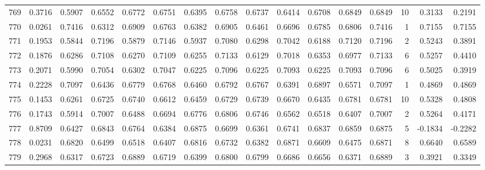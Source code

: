 \begin{tabular}{lrrrrrrrrrrrrrrr}
769 &      0.3716 &  0.5907 &  0.6552 &  0.6772 &  0.6751 &  0.6395 &  0.6758 &  0.6737 &  0.6414 &  0.6708 &   0.6849 &     0.6849 &     10 &                    0.3133 &                     0.2191 \\
770 &      0.0261 &  0.7416 &  0.6312 &  0.6909 &  0.6763 &  0.6382 &  0.6905 &  0.6461 &  0.6696 &  0.6785 &   0.6806 &     0.7416 &      1 &                    0.7155 &                     0.7155 \\
771 &      0.1953 &  0.5844 &  0.7196 &  0.5879 &  0.7146 &  0.5937 &  0.7080 &  0.6298 &  0.7042 &  0.6188 &   0.7120 &     0.7196 &      2 &                    0.5243 &                     0.3891 \\
772 &      0.1876 &  0.6286 &  0.7108 &  0.6270 &  0.7109 &  0.6255 &  0.7133 &  0.6129 &  0.7018 &  0.6353 &   0.6977 &     0.7133 &      6 &                    0.5257 &                     0.4410 \\
773 &      0.2071 &  0.5990 &  0.7054 &  0.6302 &  0.7047 &  0.6225 &  0.7096 &  0.6225 &  0.7093 &  0.6225 &   0.7093 &     0.7096 &      6 &                    0.5025 &                     0.3919 \\
774 &      0.2228 &  0.7097 &  0.6436 &  0.6779 &  0.6768 &  0.6460 &  0.6792 &  0.6767 &  0.6391 &  0.6897 &   0.6571 &     0.7097 &      1 &                    0.4869 &                     0.4869 \\
775 &      0.1453 &  0.6261 &  0.6725 &  0.6740 &  0.6612 &  0.6459 &  0.6729 &  0.6739 &  0.6670 &  0.6435 &   0.6781 &     0.6781 &     10 &                    0.5328 &                     0.4808 \\
776 &      0.1743 &  0.5914 &  0.7007 &  0.6488 &  0.6694 &  0.6776 &  0.6806 &  0.6746 &  0.6562 &  0.6518 &   0.6407 &     0.7007 &      2 &                    0.5264 &                     0.4171 \\
777 &      0.8709 &  0.6427 &  0.6843 &  0.6764 &  0.6384 &  0.6875 &  0.6699 &  0.6361 &  0.6741 &  0.6837 &   0.6859 &     0.6875 &      5 &                   -0.1834 &                    -0.2282 \\
778 &      0.0231 &  0.6820 &  0.6499 &  0.6518 &  0.6407 &  0.6816 &  0.6732 &  0.6382 &  0.6871 &  0.6609 &   0.6475 &     0.6871 &      8 &                    0.6640 &                     0.6589 \\
779 &      0.2968 &  0.6317 &  0.6723 &  0.6889 &  0.6719 &  0.6399 &  0.6800 &  0.6799 &  0.6686 &  0.6656 &   0.6371 &     0.6889 &      3 &                    0.3921 &                     0.3349 \\

\end{tabular}
